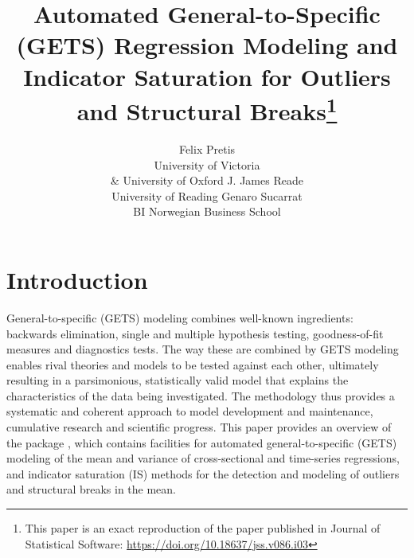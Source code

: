 \documentclass[article,nojss]{jss}
\author{
	Felix Pretis\\University of Victoria \\ \& University of Oxford \And
	J. James Reade\\ University of Reading \And
	Genaro Sucarrat\\BI Norwegian Business School
}
\title{Automated General-to-Specific (GETS) Regression Modeling and Indicator Saturation for Outliers and Structural Breaks\thanks{This paper is an exact reproduction of the paper published in Journal of Statistical Software: \url{https://doi.org/10.18637/jss.v086.i03}}}
\begin{document}

\section{Introduction}

General-to-specific (GETS) modeling combines well-known ingredients:
backwards elimination, single and multiple hypothesis testing,
goodness-of-fit measures and diagnostics tests. The way these are
combined by GETS modeling enables rival theories and models to be
tested against each other, ultimately resulting in a parsimonious,
statistically valid model that explains the characteristics of the
data being investigated. The methodology thus provides a systematic
and coherent approach to model development and maintenance, cumulative
research and scientific progress. This paper provides an overview of
the  \citep{RCoreTeam2016} package 
\citep{gets}, which contains facilities for automated
general-to-specific (GETS) modeling of the mean and variance of
cross-sectional and time-series regressions, and indicator saturation
(IS) methods for the detection and modeling of outliers and structural
breaks in the mean.
\end{document}
